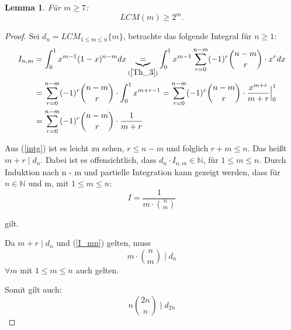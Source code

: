\documentclass[12pt,oneside]{article}
\newtheorem{lemma}[theorem]{Lemma}
\theoremstyle{remark}
\theoremstyle{definition}
\begin{document}
\begin{flushleft}
\smallskip

\begin{lemma}\label{lemma_1}
Für $m \geq 7$:\newline
\begin{equation}
    LCM(m) \geq 2^m.  
\end{equation}
\end{lemma}

\begin{proof}
Sei $d_{n} = LCM_{1 \leq m \leq n}{\{m\}}$, betrachte das folgende Integral für $n \geq 1$:\newline
\begin{equation}\label{intg}
    \begin{split}
      \begin{aligned}
        I_{n,m}&= \int_{0}^{1} x^{m-1} (1-x)^{n - m} dx \underbrace{=}_{(\ref{Th_3})} \int_{0}^{1} x^{m-1} \sum_{r = 0}^{n - m} (-1)^r {n - m\choose r} \cdot x^r dx \\
        &= \sum_{r = 0}^{n - m}(-1)^r {n - m \choose r} \cdot \int_{0}^{1} x^{m + r - 1} 
        = \sum_{r = 0}^{n - m} (-1)^r {n - m \choose r} \cdot \frac{x^{m+r}}{m+r}\Big|_0^1\\
        &= \sum_{r = 0}^{n - m} (-1)^r {n - m \choose r} \cdot \frac{1}{m + r}
      \end{aligned}
    \end{split}
\end{equation}

Aus (\ref{intg}) ist es leicht zu sehen, $r \leq n - m $ und folglich $ r + m \leq n $. Das heißt $m + r \mid d_{n}$. Dabei ist es offensichtlich, dass $d_{n} \cdot I_{n,m} \in \mathbb{N}$, für $1 \leq m \leq n$. Durch Induktion nach n - m und partielle Integration kann gezeigt werden, dass für $n \in \mathbb{N}$ und m, mit $1 \leq m \leq n$:
\begin{equation}\label{I_mn}
    I = \frac{1}{m \cdot {n \choose m}}
\end{equation}

gilt.\newline\newline

Da $m + r \mid d_{n} $ und (\ref{I_mn}) gelten, muss
\begin{equation}
    m \cdot {n \choose m} \mid d_{n}
\end{equation}
$\forall m $ mit $1 \leq m \leq n $ auch gelten.\newline

Somit gilt auch: 
\begin{equation}\label{d2n}
    n {2n\choose n} \mid d_{2n}
\end{equation}


\end{proof}
\end{flushleft}
\end{document}

